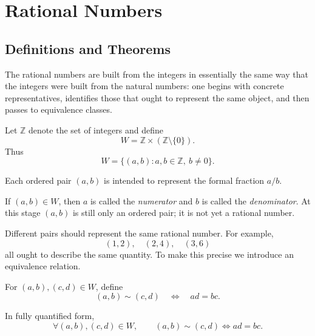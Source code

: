 
\section{Rational Numbers}
\label{sec:rational-numbers}

\subsection{Definitions and Theorems}

The rational numbers are built from the integers in essentially the same way that the integers were
built from the natural numbers: one begins with concrete representatives, identifies those that ought
to represent the same object, and then passes to equivalence classes.

\begin{definition}
\label{def:fraction-pairs}

Let $\mathbb{Z}$ denote the set of integers and define
\[
W = \mathbb{Z} \times (\mathbb{Z}\setminus\{0\}).
\]
Thus
\[
W = \{(a,b) : a,b\in\mathbb{Z},\ b\neq 0\}.
\]

Each ordered pair $(a,b)$ is intended to represent the formal fraction $a/b$.

\end{definition}

\begin{remark}
\label{rem:numerator-denominator}

If $(a,b)\in W$, then $a$ is called the \emph{numerator} and $b$ is called the
\emph{denominator}.  At this stage $(a,b)$ is still only an ordered pair; it is not yet a rational
number.

\end{remark}

\begin{remark}
Different pairs should represent the same rational number.  For example,
\[
(1,2),\quad (2,4),\quad (3,6)
\]
all ought to describe the same quantity.  To make this precise we introduce an equivalence relation.
\end{remark}

\begin{definition}
\label{def:fraction-pair-equality}

For $(a,b),(c,d)\in W$, define
\[
(a,b) \sim (c,d)
\quad\Longleftrightarrow\quad
ad = bc.
\]

In fully quantified form,
\[
\forall (a,b),(c,d)\in W,
\qquad
(a,b)\sim(c,d)
\Longleftrightarrow
ad=bc.
\]

\end{definition}

